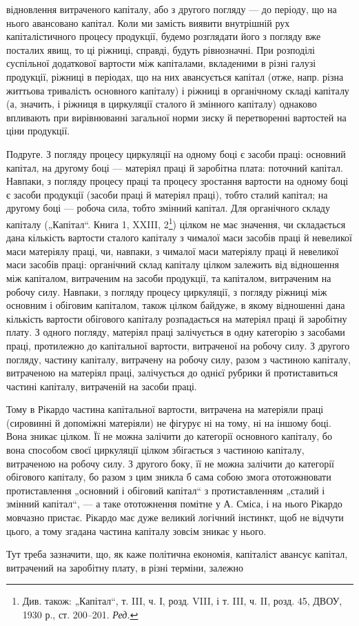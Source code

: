 \parcont{}  %
відновлення витраченого капіталу, або з другого погляду — до періоду,
що на нього авансовано капітал. Коли ми замість виявити внутрішній
рух капіталістичного процесу продукції, будемо розглядати його з погляду
вже посталих явищ, то ці ріжниці, справді, будуть рівнозначні. При
розподілі суспільної додаткової вартости між капіталами, вкладеними
в різні галузі продукції, ріжниці в періодах, що на них авансується
капітал (отже, напр. різна життьова тривалість основного капіталу) і
ріжниці в органічному складі капіталу (а, значить, і ріжниця в циркуляції
сталого й змінного капіталу) однаково впливають при вирівнюванні загальної
норми зиску й перетворенні вартостей на ціни продукції.

Подруге. З погляду процесу циркуляції на одному боці є засоби
праці: основний капітал, на другому боці — матеріял праці й заробітна
плата: поточний капітал. Навпаки, з погляду процесу праці та процесу
зростання вартости на одному боці є засоби продукції (засоби праці й
матеріял праці), тобто сталий капітал; на другому боці — робоча сила, тобто
змінний капітал. Для органічного складу капіталу („Капітал“. Книга 1,
XXIII, 2\footnote*{
Див. також: „Капітал“, т. III, ч. І, розд. VIII, і т. III, ч. II, розд. 45, ДВОУ,
1930 р., ст. 200--201. \emph{Ред.}
}) цілком не має значення, чи складається дана кількість вартости
сталого капіталу з чималої маси засобів праці й невеликої маси
матеріялу праці, чи, навпаки, з чималої маси матеріялу праці й невеликої
маси засобів праці: органічний склад капіталу цілком залежить від відношення
між капіталом, витраченим на засоби продукції, та капіталом, витраченим
на робочу силу. Навпаки, з погляду процесу циркуляції, з погляду
ріжниці між основним і обіговим капіталом, також цілком байдуже,
в якому відношенні дана кількість вартости обігового капіталу розпадається
на матеріял праці й заробітну плату. З одного погляду, матеріял
праці залічується в одну категорію з засобами праці, протилежно до
капітальної вартости, витраченої на робочу силу. З другого погляду,
частину капіталу, витрачену на робочу силу, разом з частиною капіталу,
витраченою на матеріял праці, залічується до однієї рубрики й протиставиться
частині капіталу, витраченій на засоби праці.

Тому в Рікардо частина капітальної вартости, витрачена на матеріяли
праці (сировинні й допоміжні матеріяли) не фігурує ні на тому, ні на іншому
боці. Вона зникає цілком. Її не можна залічити до категорії основного
капіталу, бо вона способом своєї циркуляції цілком збігається
з частиною капіталу, витраченою на робочу силу. З другого боку, її не
можна залічити до категорії обігового капіталу, бо разом з цим зникла
б сама собою змога ототожнювати протиставлення „основний і обіговий
капітал“ з протиставленням „сталий і змінний капітал“, — а таке ототожнення
помітне у А. Сміса, і на нього Рікардо мовчазно пристає. Рікардо
має дуже великий логічний інстинкт, щоб не відчути цього, а тому згадана
частина капіталу зовсім зникає у нього.

Тут треба зазначити, що, як каже політична економія, капіталіст
авансує капітал, витрачений на заробітну плату, в різні терміни, залежно
\parbreak{}  %
